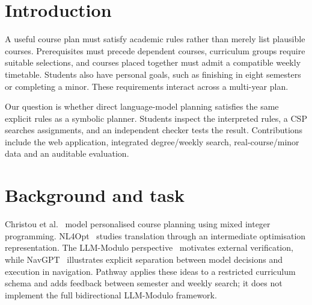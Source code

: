 \begin{abstract}
We present Pathway, a course planner that translates natural-language goals into editable constraint cards and uses constraint optimisation to construct a degree plan. The system combines semester assignment with whole-class weekly timetable search, independent academic checks and NUSMods export. Its reference snapshot contains 338 real courses and templates for Mathematics and Quantitative Finance minors. We evaluate direct LLM-generated plans against the necessary requirements implemented in the CSP, including prerequisite order, foundation coverage, minimum units and curriculum groups. A separate analysis checks semester offerings, exams and weekly feasibility. The archived experiment covers 15 model IDs under three rule-disclosure conditions. Only evaluable schedules receive compliance scores; unavailable or truncated responses remain unscored. We also prepare 15 anonymous schedules for two internal raters, with explicitly pending qualitative results. The system makes its checks inspectable, but bounded search and incomplete curriculum coverage limit its guarantees.
\end{abstract}

\section{Introduction}
A useful course plan must satisfy academic rules rather than merely list plausible courses. Prerequisites must precede dependent courses, curriculum groups require suitable selections, and courses placed together must admit a compatible weekly timetable. Students also have personal goals, such as finishing in eight semesters or completing a minor. These requirements interact across a multi-year plan.

Our question is whether direct language-model planning satisfies the same explicit rules as a symbolic planner. Students inspect the interpreted rules, a CSP searches assignments, and an independent checker tests the result. Contributions include the web application, integrated degree/weekly search, real-course/minor data and an auditable evaluation.

\section{Background and task}
Christou et al.~\cite{christou} model personalised course planning using mixed integer programming. NL4Opt~\cite{nl4opt} studies translation through an intermediate optimisation representation. The LLM-Modulo perspective~\cite{modulo} motivates external verification, while NavGPT~\cite{navgpt} illustrates explicit separation between model decisions and execution in navigation. Pathway applies these ideas to a restricted curriculum schema and adds feedback between semester and weekly search; it does not implement the full bidirectional LLM-Modulo framework.

